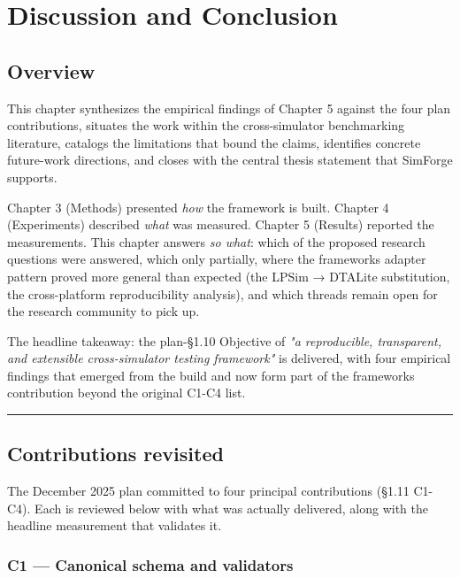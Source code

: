 \chapter{Discussion and
Conclusion}\label{chapter-6-discussion-and-conclusion}

\section{Overview}\label{60-overview}

This chapter synthesizes the empirical findings of Chapter 5 against the
four plan contributions, situates the work within the
cross-simulator benchmarking literature, catalogs the limitations that
bound the claims, identifies concrete future-work directions, and closes
with the central thesis statement that SimForge supports.

Chapter 3 (Methods) presented \emph{how} the framework is built. Chapter
4 (Experiments) described \emph{what} was measured. Chapter 5 (Results)
reported the measurements. This chapter answers \emph{so what}: which of
the proposed research questions were answered, which only partially,
where the framework\textquotesingle s adapter pattern proved more
general than expected (the LPSim → DTALite substitution, the
cross-platform reproducibility analysis), and which threads remain open
for the research community to pick up.

The headline takeaway: the plan-§1.10 Objective of \emph{"a
reproducible, transparent, and extensible cross-simulator testing
framework"} is delivered, with four empirical findings that emerged from
the build and now form part of the framework\textquotesingle s
contribution beyond the original C1-C4 list.

\begin{center}\rule{0.5\linewidth}{0.5pt}\end{center}

\section{Contributions revisited}\label{61-contributions-revisited}

The December 2025 plan committed to four principal contributions
(§1.11 C1-C4). Each is reviewed below with what was actually delivered,
along with the headline measurement that validates it.

\subsection{C1 --- Canonical schema and
validators}\label{611-c1--canonical-schema-and-validators}

